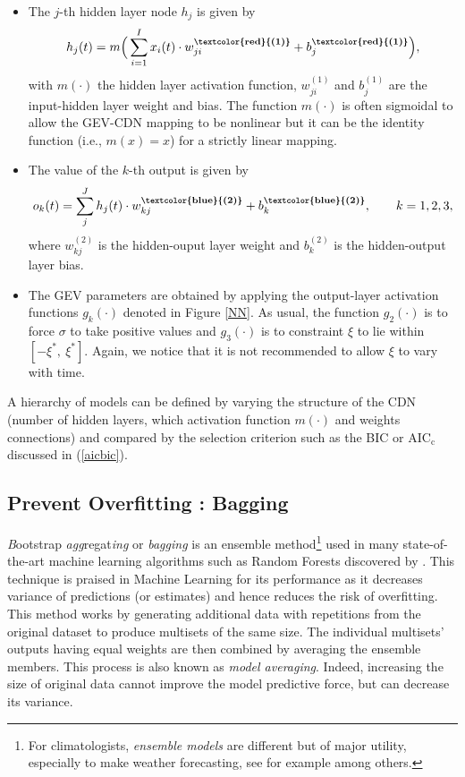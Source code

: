 \begin{itemize} 

\item The $j$-th hidden layer node $h_j$ is given by 
\begin{equation}\label{eq:nnlay1}
h_j(t)=m\Big(\sum_{i=1}^{I}x_i(t)\cdot  w_{ji}^{\textbf{\textcolor{red}{(1)}}}+b_j^{\textbf{\textcolor{red}{(1)}}}\Big),
\end{equation}
with $m(\cdot)$ the hidden layer activation function, $w_{ji}^{(1)}$ and $b_j^{(1)}$ are the input-hidden layer weight and bias. The function $m(\cdot)$ is often sigmoidal to allow the GEV-CDN mapping to be nonlinear but it can be the identity function (i.e., $m(x)=x$) for a strictly linear mapping.

\item The value of the $k$-th output is given by 
\begin{equation}\label{eq:nnlay2}
o_k(t)=\sum_j^Jh_j(t)\cdot w_{kj}^{\textbf{\textbf{\textcolor{blue}{(2)}}}}+b^{\textbf{\textbf{\textcolor{blue}{(2)}}}}_k, \qquad k=1,2,3 ,
\end{equation}
where $w_{kj}^{(2)}$ is the hidden-ouput layer weight and $b^{(2)}_k$ is the hidden-output layer bias.
	
\item The GEV parameters are obtained by applying the output-layer activation functions $g_k(\cdot)$ denoted in Figure \ref{NN}. As usual, the function $g_2(\cdot)$ is to force $\sigma$ to take positive values and $g_3(\cdot)$ is to constraint $\xi$ to lie within $[-\xi^{*},\ \xi^{*}]$. Again, we notice that it is not recommended to allow $\xi$ to vary with time. 
	
\end{itemize}
A hierarchy of models can be defined by varying the structure of the CDN (number of hidden layers, which activation function $m(\cdot)$ and weights connections)  and compared by the selection criterion such as the BIC or $\text{AIC}_{\text{c}}$ discussed in (\ref{aicbic}). 


\subsection{Prevent Overfitting : Bagging}\label{sec:bagg} 


\emph{B}ootstrap \emph{agg}regat\emph{ing} or \emph{bagging} is an ensemble method\footnote{For climatologists, \emph{ensemble models} are different but of major utility, especially to make weather forecasting, see for example \citet{suh_development_2012} among others.} used in many state-of-the-art machine learning algorithms such as Random Forests discovered by \citet{Breiman_2001}. This technique is praised in Machine Learning for its performance as it decreases variance of predictions (or estimates) and hence reduces the risk of overfitting. This method works by generating additional data with repetitions from the original dataset to produce multisets of the same size.
The  individual  multisets’  outputs  having equal  weights  are  then  combined  by  averaging the ensemble members. This process is also known as \emph{model averaging}.
Indeed, increasing the size of original data cannot improve the model predictive force, but can decrease its variance.

